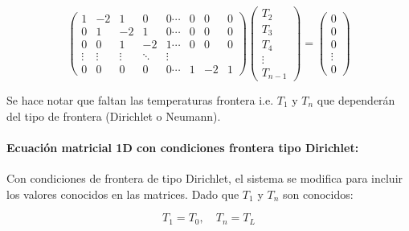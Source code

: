 \documentclass[11pt,a4paper]{article}
\begin{document}
\begin{equation}
\begin{pmatrix}
1 & -2 & 1 & 0 & 0  \cdots & 0 & 0 & 0 \\
0 & 1 & -2 & 1 & 0  \cdots & 0 & 0 & 0 \\
0 & 0 & 1 & -2 & 1  \cdots & 0 & 0 & 0 \\
\vdots & \vdots & \vdots & \ddots & \vdots \\
0 & 0 & 0 & 0 & 0  \cdots & 1 & -2 & 1
\end{pmatrix}
\begin{pmatrix}
T_2 \\
T_3 \\
T_4 \\
\vdots \\
T_{n-1}
\end{pmatrix}
=
\begin{pmatrix}
0 \\
0 \\
0 \\
\vdots \\
0
\end{pmatrix}
\end{equation}

Se hace notar que faltan las temperaturas frontera i.e. $T_1$ y $T_n$ que 
depender\'an del tipo de frontera (Dirichlet o Neumann).

\medskip

\paragraph{Ecuaci\'on matricial 1D con condiciones frontera tipo Dirichlet:}

Con condiciones de frontera de tipo Dirichlet, el sistema se modifica para 
incluir los valores conocidos en las matrices. Dado que $T_1$ y $T_n$ son 
conocidos:

\begin{equation}
T_1 = T_0, \quad T_n = T_L
\end{equation}
\end{document}
